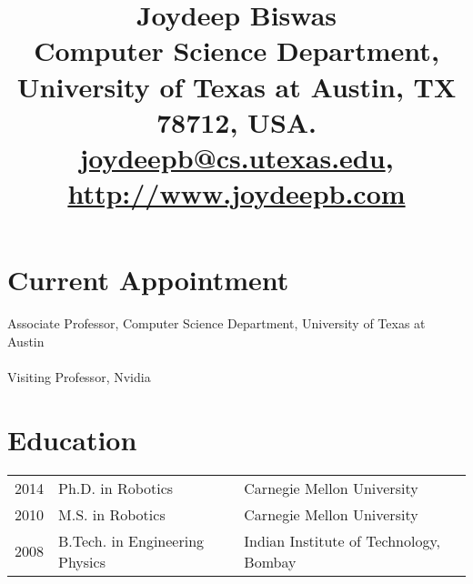 \documentclass[Times]{article}
\begin{document}
\title{
\vspace{-3em}
\textbf{Joydeep Biswas}\\
\vspace{0.5em}
\normalsize{
Computer Science Department, University of Texas at Austin, TX 78712, USA.\\
\href{mailto:joydeepb@cs.utexas.edu}{joydeepb@cs.utexas.edu}, \href{http://www.joydeepb.com}{http://www.joydeepb.com}\vspace{-3em}}
}
\date{}
\maketitle


\section*{Current Appointment}

Associate Professor, Computer Science Department,
University of Texas at Austin\\
\vspace{-0.5em}\\
Visiting Professor, Nvidia

\section*{Education}
\begin{tabular}{ p{1.2cm} l l }
  2014  & Ph.D. in Robotics  & Carnegie Mellon University \\
  2010  & M.S. in Robotics  & Carnegie Mellon University \\
  2008  & B.Tech. in Engineering Physics & Indian Institute of Technology, Bombay \\
\end{tabular}
\end{document}

